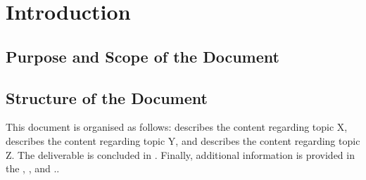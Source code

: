 
\clearpage
\section{Introduction}
\label{sec:introduction}


\subsection{Purpose and Scope of the Document}
\label{sec:purpose}


\subsection{Structure of the Document}
\label{sec:structure}

This document is organised as follows:  describes the content regarding topic X,  describes the content regarding topic Y, and  describes the content regarding topic Z. The deliverable is concluded in . 
Finally, additional information is provided in the , , and ..

